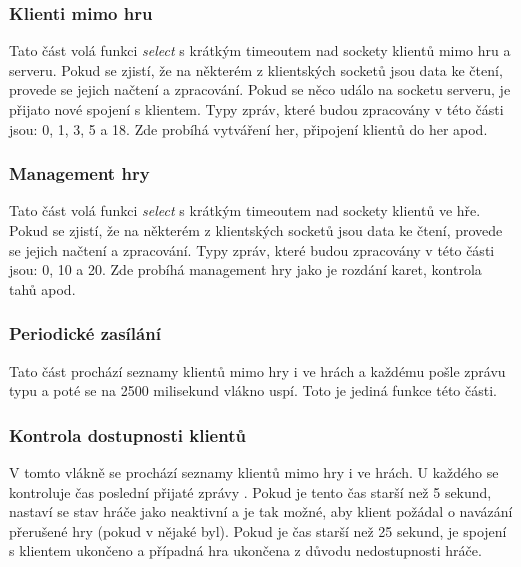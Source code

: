 \documentclass[12pt, a4paper]{article}
\begin{document}
		
			\subsubsection{Klienti mimo hru}
			Tato část volá funkci \emph{select} s krátkým timeoutem nad sockety klientů mimo hru a serveru. Pokud se zjistí, že na některém z klientských socketů jsou data ke čtení, provede se jejich načtení a zpracování. Pokud se něco událo na socketu serveru, je přijato nové spojení s klientem. Typy zpráv, které budou zpracovány v této části jsou: 0, 1, 3, 5 a 18. Zde probíhá vytváření her, připojení klientů do her apod.
			
			\subsubsection{Management hry}
			Tato část volá funkci \emph{select} s krátkým timeoutem nad sockety klientů ve hře. Pokud se zjistí, že na některém z klientských socketů jsou data ke čtení, provede se jejich načtení a zpracování. Typy zpráv, které budou zpracovány v této části jsou: 0, 10 a 20. Zde probíhá management hry jako je rozdání karet, kontrola tahů apod.
			
			\subsubsection{Periodické zasílání }
			Tato část prochází seznamy klientů mimo hry i ve hrách a každému pošle zprávu typu a poté se na 2500 milisekund vlákno uspí. Toto je jediná funkce této části.
			
			\subsubsection{Kontrola dostupnosti klientů}
			V tomto vlákně se prochází seznamy klientů mimo hry i ve hrách. U každého se kontroluje čas poslední přijaté zprávy . Pokud je tento čas starší než 5 sekund, nastaví se stav hráče jako neaktivní a je tak možné, aby klient požádal o navázání přerušené hry (pokud v nějaké byl). Pokud je čas starší než 25 sekund, je spojení s klientem ukončeno a případná hra ukončena z důvodu nedostupnosti hráče.
		
\end{document}
